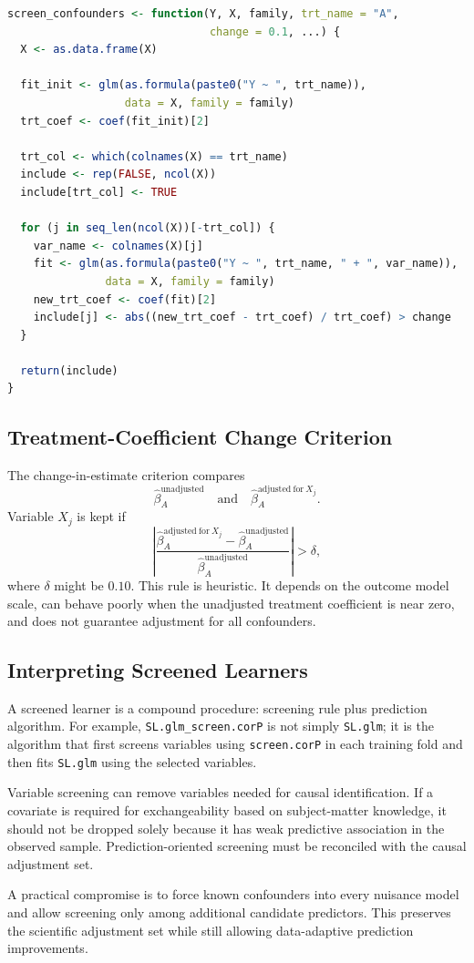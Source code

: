 \begin{implementationbox}
\begin{lstlisting}[language=R]
screen_confounders <- function(Y, X, family, trt_name = "A",
                               change = 0.1, ...) {
  X <- as.data.frame(X)

  fit_init <- glm(as.formula(paste0("Y ~ ", trt_name)),
                  data = X, family = family)
  trt_coef <- coef(fit_init)[2]

  trt_col <- which(colnames(X) == trt_name)
  include <- rep(FALSE, ncol(X))
  include[trt_col] <- TRUE

  for (j in seq_len(ncol(X))[-trt_col]) {
    var_name <- colnames(X)[j]
    fit <- glm(as.formula(paste0("Y ~ ", trt_name, " + ", var_name)),
               data = X, family = family)
    new_trt_coef <- coef(fit)[2]
    include[j] <- abs((new_trt_coef - trt_coef) / trt_coef) > change
  }

  return(include)
}
\end{lstlisting}
\end{implementationbox}

\subsection{Treatment-Coefficient Change Criterion}

The change-in-estimate criterion compares
\[
\hat\beta_A^{\mathrm{unadjusted}}
\quad\text{and}\quad
\hat\beta_A^{\mathrm{adjusted\ for\ }X_j}.
\]
Variable $X_j$ is kept if
\[
\left|
\frac{\hat\beta_A^{\mathrm{adjusted\ for\ }X_j}
-\hat\beta_A^{\mathrm{unadjusted}}}
{\hat\beta_A^{\mathrm{unadjusted}}}
\right|>\delta,
\]
where $\delta$ might be $0.10$. This rule is heuristic. It depends on the outcome
model scale, can behave poorly when the unadjusted treatment coefficient is near zero,
and does not guarantee adjustment for all confounders.

\subsection{Interpreting Screened Learners}

A screened learner is a compound procedure: screening rule plus prediction algorithm.
For example, \texttt{SL.glm\_screen.corP} is not simply \texttt{SL.glm}; it is the
algorithm that first screens variables using \texttt{screen.corP} in each training fold
and then fits \texttt{SL.glm} using the selected variables.

\begin{assumptionbox}
Variable screening can remove variables needed for causal identification. If a
covariate is required for exchangeability based on subject-matter knowledge, it should
not be dropped solely because it has weak predictive association in the observed
sample. Prediction-oriented screening must be reconciled with the causal adjustment
set.
\end{assumptionbox}

\begin{estimationbox}
A practical compromise is to force known confounders into every nuisance model and
allow screening only among additional candidate predictors. This preserves the
scientific adjustment set while still allowing data-adaptive prediction improvements.
\end{estimationbox}
